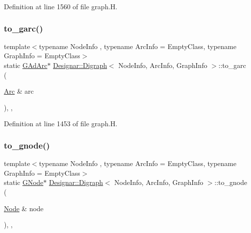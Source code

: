 Definition at line 1560 of file graph.\+H.

\mbox{\label{class_designar_1_1_digraph_a6137e6849dcb4208e9c8daa26f303868}} 
\subsubsection{\texorpdfstring{to\+\_\+garc()}{to\_garc()}}
{\footnotesize\ttfamily template$<$typename Node\+Info , typename Arc\+Info  = Empty\+Class, typename Graph\+Info  = Empty\+Class$>$ \\
static \hyperlink{class_designar_1_1_digraph_a0c6d846f23d1e82556fb6055557df53f}{G\+Ad\+Arc}$\ast$ \hyperlink{class_designar_1_1_digraph}{Designar\+::\+Digraph}$<$ Node\+Info, Arc\+Info, Graph\+Info $>$\+::to\+\_\+garc (\begin{DoxyParamCaption}\item[{\hyperlink{class_designar_1_1_digraph_a0ceb278671f2a535c00fddccdeafd69f}{Arc} \&}]{arc }\end{DoxyParamCaption})\hspace{0.3cm}{\ttfamily [inline]}, {\ttfamily [static]}, {\ttfamily [protected]}}



Definition at line 1453 of file graph.\+H.

\mbox{\label{class_designar_1_1_digraph_ae0a945e347e8e6a15df21df4fe2c1782}} 
\subsubsection{\texorpdfstring{to\+\_\+gnode()}{to\_gnode()}}
{\footnotesize\ttfamily template$<$typename Node\+Info , typename Arc\+Info  = Empty\+Class, typename Graph\+Info  = Empty\+Class$>$ \\
static \hyperlink{class_designar_1_1_digraph_a33b0d2b8820ada501522b0e67e63524a}{G\+Node}$\ast$ \hyperlink{class_designar_1_1_digraph}{Designar\+::\+Digraph}$<$ Node\+Info, Arc\+Info, Graph\+Info $>$\+::to\+\_\+gnode (\begin{DoxyParamCaption}\item[{\hyperlink{class_designar_1_1_digraph_a4dc921c41a480b7946a04170e997d8ae}{Node} \&}]{node }\end{DoxyParamCaption})\hspace{0.3cm}{\ttfamily [inline]}, {\ttfamily [static]}, {\ttfamily [protected]}}



